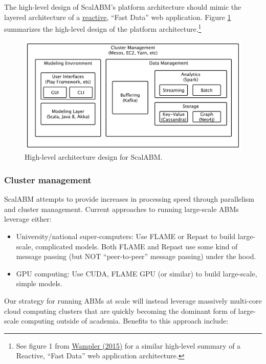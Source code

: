 \documentclass[a4paper]{article}
\begin{document}
The high-level design of ScalABM's platform architecture should mimic the layered architecture of a \href{http://www.reactivemanifesto.org/}{reactive}, ``Fast Data'' web application. Figure \ref{fig:architecture} summarizes the high-level design of the platform architecture.\footnote{
See figure 1 from \href{./fast-data-big-data-evolved.pdf}{Wampler (2015)} for a similar high-level summary of a Reactive, ``Fast Data'' web application architecture.}

\begin{figure}
\centering
\includegraphics[width=12cm]{img/coarse-grain-schema-2.pdf}
\caption{High-level architecture design for ScalABM.}
\label{fig:architecture}
\end{figure}

\subsubsection{Cluster management} 
ScalABM attempts to provide increases in processing speed through parallelism and cluster management. Current approaches to running large-scale ABMs leverage either:
\begin{itemize}
    \item University/national super-computers: Use FLAME or Repast to build large-scale, complicated models. Both FLAME and Repast use some kind of message passing (but NOT ``peer-to-peer'' message passing) under the hood.
    \item GPU computing: Use CUDA, FLAME GPU (or similar) to build large-scale, simple models.
\end{itemize}
Our strategy for running ABMs at scale will instead leverage massively multi-core cloud computing clusters that are quickly becoming the dominant form of large-scale computing outside of academia. Benefits to this approach include:
\end{document}
